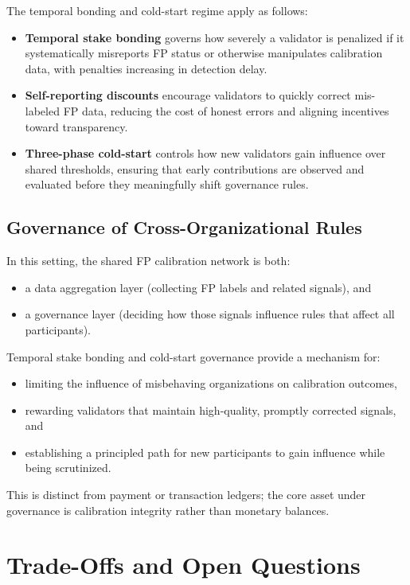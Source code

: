 \documentclass[11pt]{article}
\begin{document}
The temporal bonding and cold-start regime apply as follows:
\begin{itemize}[leftmargin=*]
  \item \textbf{Temporal stake bonding} governs how severely a validator is penalized if it systematically misreports FP status or otherwise manipulates calibration data, with penalties increasing in detection delay.
  \item \textbf{Self-reporting discounts} encourage validators to quickly correct mis-labeled FP data, reducing the cost of honest errors and aligning incentives toward transparency.
  \item \textbf{Three-phase cold-start} controls how new validators gain influence over shared thresholds, ensuring that early contributions are observed and evaluated before they meaningfully shift governance rules.
\end{itemize}

\subsection{Governance of Cross-Organizational Rules}

In this setting, the shared FP calibration network is both:
\begin{itemize}[leftmargin=*]
  \item a data aggregation layer (collecting FP labels and related signals), and
  \item a governance layer (deciding how those signals influence rules that affect all participants).
\end{itemize}

Temporal stake bonding and cold-start governance provide a mechanism for:
\begin{itemize}[leftmargin=*]
  \item limiting the influence of misbehaving organizations on calibration outcomes,
  \item rewarding validators that maintain high-quality, promptly corrected signals, and
  \item establishing a principled path for new participants to gain influence while being scrutinized.
\end{itemize}

This is distinct from payment or transaction ledgers; the core asset under governance is calibration integrity rather than monetary balances.

\section{Trade-Offs and Open Questions}
\end{document}
